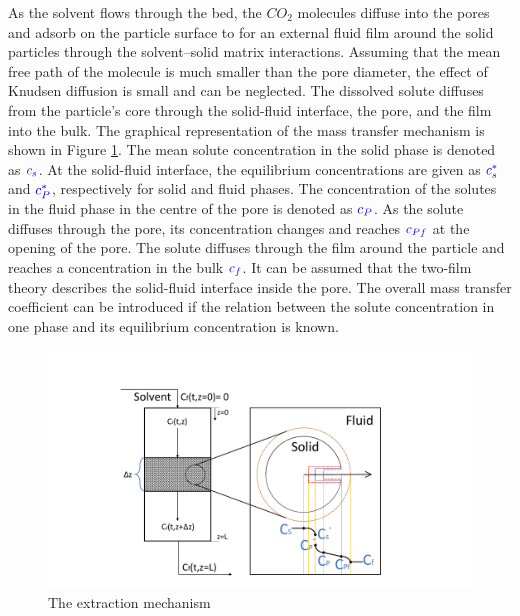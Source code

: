 \documentclass[../Article_Model_Parameters.tex]{subfiles}
\begin{document}
	As the solvent flows through the bed, the $CO_2$ molecules diffuse into the pores and adsorb on the particle surface to for an external fluid film around the solid particles through the solvent–solid matrix interactions. Assuming that the mean free path of the molecule is much smaller than the pore diameter, the effect of Knudsen diffusion is small and can be neglected. The dissolved solute diffuses from the particle's core through the solid-fluid interface, the pore, and the film into the bulk. The graphical representation of the mass transfer mechanism is shown in Figure \ref{fig: SFE_Mechanism}. The mean solute concentration in the solid phase is denoted as ${\color{blue}c_s}$. At the solid-fluid interface, the equilibrium concentrations are given as ${\color{blue}c_s^*}$ and ${\color{blue}c_P^*}$, respectively for solid and fluid phases. The concentration of the solutes in the fluid phase in the centre of the pore is denoted as ${\color{blue}c_{P}}$. As the solute diffuses through the pore, its concentration changes and reaches ${\color{blue}c_{Pf}}$ at the opening of the pore. The solute diffuses through the film around the particle and reaches a concentration in the bulk ${\color{blue}c_f}$. It can be assumed that the two-film theory describes the solid-fluid interface inside the pore. The overall mass transfer coefficient can be introduced if the relation between the solute concentration in one phase and its equilibrium concentration is known.
			
		\begin{figure}[h!]
			\centering
			\includegraphics[trim = 5.8cm 1.1cm 6cm 3cm,clip,width=\columnwidth]{Figures/SFE_draft.pdf}	
			\caption{The extraction mechanism}
			\label{fig: SFE_Mechanism}
		\end{figure}
			
\end{document}
